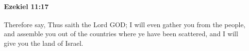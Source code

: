 
		\paragraph{Ezekiel 11:17} %
			\label{EZEKIEL-11-17}

			Therefore say, Thus saith the Lord GOD; I will even gather you from the people, and assemble you out of the countries where ye have been scattered, and I will give you the land of Israel.


